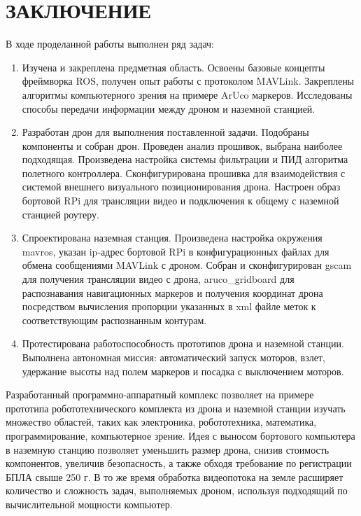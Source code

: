 \documentclass[a4paper,12pt]{article}
\begin{document}
\section*{\centering ЗАКЛЮЧЕНИЕ}
В ходе проделанной работы выполнен ряд задач:
\begin{enumerate}
	\item Изучена и закреплена предметная область. Освоены базовые концепты фреймворка ROS, получен опыт работы с протоколом MAVLink. Закреплены алгоритмы компьютерного зрения на примере ArUco маркеров. Исследованы способы передачи информации между дроном и наземной станцией.
	\item Разработан дрон для выполнения поставленной задачи. Подобраны компоненты и собран дрон. Проведен анализ прошивок, выбрана наиболее подходящая. Произведена настройка системы фильтрации и ПИД алгоритма полетного контроллера. Сконфигурирована прошивка для взаимодействия с системой внешнего визуального позиционирования дрона. Настроен образ бортовой RPi для трансляции видео и подключения к общему с наземной станцией роутеру.
	\item Спроектирована наземная станция. Произведена настройка окружения mavros, указан ip-адрес бортовой RPi в конфигурационных файлах для обмена сообщениями MAVLink с дроном. Собран и сконфигурирован gscam для получения трансляции видео с дрона, aruco\_grid\-board для распознавания навигационных маркеров и получения координат дрона посредством вычисления пропорции указанных в xml файле меток к соответствующим распознанным контурам.
	\item Протестирована работоспособность прототипов дрона и наземной станции. Выполнена автономная миссия: автоматический запуск моторов, взлет, удержание высоты над полем маркеров и посадка с выключением моторов.
\end{enumerate}

Разработанный программно-аппаратный комплекс позволяет на примере прототипа робототехнического комплекта из дрона и наземной станции изучать множество областей, таких как электроника, робототехника, математика, программирование, компьютерное зрение. Идея с выносом бортового компьютера в наземную станцию позволяет уменьшить размер дрона, снизив стоимость компонентов, увеличив безопасность, а также обходя требование по регистрации БПЛА свыше 250 г. В то же время обработка видеопотока на земле расширяет количество и сложность задач, выполняемых дроном, используя подходящий по вычислительной мощности компьютер.
\end{document}
